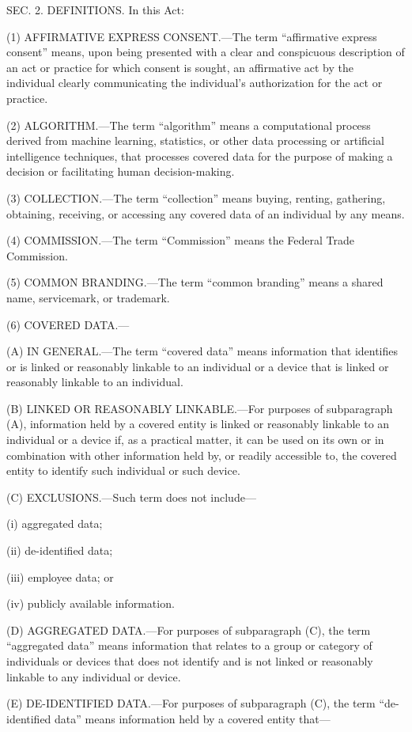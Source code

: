 SEC. 2. DEFINITIONS.
In this Act:

(1) AFFIRMATIVE EXPRESS CONSENT.—The term “affirmative express consent” means, upon being presented with a clear and conspicuous description of an act or practice for which consent is sought, an affirmative act by the individual clearly communicating the individual’s authorization for the act or practice.

(2) ALGORITHM.—The term “algorithm” means a computational process derived from machine learning, statistics, or other data processing or artificial intelligence techniques, that processes covered data for the purpose of making a decision or facilitating human decision-making.

(3) COLLECTION.—The term “collection” means buying, renting, gathering, obtaining, receiving, or accessing any covered data of an individual by any means.

(4) COMMISSION.—The term “Commission” means the Federal Trade Commission.

(5) COMMON BRANDING.—The term “common branding” means a shared name, servicemark, or trademark.

(6) COVERED DATA.—

(A) IN GENERAL.—The term “covered data” means information that identifies or is linked or reasonably linkable to an individual or a device that is linked or reasonably linkable to an individual.

(B) LINKED OR REASONABLY LINKABLE.—For purposes of subparagraph (A), information held by a covered entity is linked or reasonably linkable to an individual or a device if, as a practical matter, it can be used on its own or in combination with other information held by, or readily accessible to, the covered entity to identify such individual or such device.

(C) EXCLUSIONS.—Such term does not include—

(i) aggregated data;

(ii) de-identified data;

(iii) employee data; or

(iv) publicly available information.

(D) AGGREGATED DATA.—For purposes of subparagraph (C), the term “aggregated data” means information that relates to a group or category of individuals or devices that does not identify and is not linked or reasonably linkable to any individual or device.

(E) DE-IDENTIFIED DATA.—For purposes of subparagraph (C), the term “de-identified data” means information held by a covered entity that—

